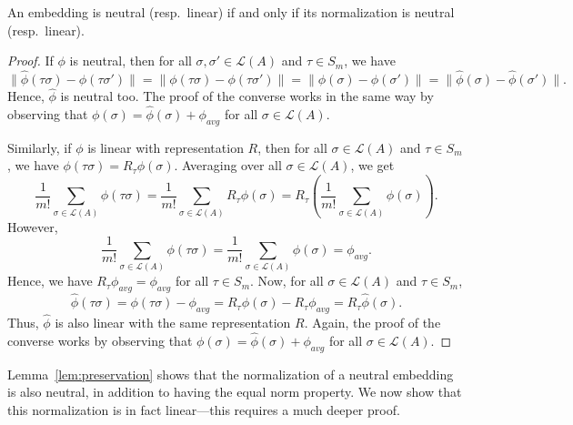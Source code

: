 \documentclass[prodmode]{acmsmall-ec14}
\newcommand{\calL}{{\mathcal{L}}}
\newcommand{\rank}{{\calL(A)}}
\begin{document}
\begin{lemma}
An embedding is neutral (resp.\ linear) if and only if its normalization is neutral (resp.\ linear). 
\label{lem:preservation}
\end{lemma}
\begin{proof}
If $\phi$ is neutral, then for all $\sigma,\sigma' \in \rank$ and $\tau \in S_m$, we have 
$$
\|\hat{\phi}(\tau \sigma)-\hat{\phi}(\tau \sigma')\| = \|\phi(\tau \sigma)-\phi(\tau \sigma')\| = \|\phi(\sigma)-\phi(\sigma')\| = \|\hat{\phi}(\sigma)-\hat{\phi}(\sigma')\|.
$$
Hence, $\hat{\phi}$ is neutral too. The proof of the converse works in the same way by observing that $\phi(\sigma) = \hat{\phi}(\sigma)+\phi_{avg}$ for all $\sigma \in \rank$. 

Similarly, if $\phi$ is linear with representation $R$, then for all $\sigma \in \rank$ and $\tau \in S_m$, we have $\phi(\tau \sigma) = R_{\tau}\phi(\sigma)$. Averaging over all $\sigma \in \rank$, we get 
$$
\frac{1}{m!} \sum_{\sigma \in \rank} \phi(\tau \sigma) = \frac{1}{m!}  \sum_{\sigma \in \rank} R_{\tau} \phi(\sigma) = R_{\tau} \left (\frac{1}{m!}  \sum_{\sigma \in \rank} \phi(\sigma) \right).
$$
However, 
$$
\frac{1}{m!}  \sum_{\sigma \in \rank} \phi(\tau \sigma) = \frac{1}{m!}  \sum_{\sigma \in \rank} \phi(\sigma) = \phi_{avg}.
$$
Hence, we have $R_{\tau}\phi_{avg} = \phi_{avg}$ for all $\tau \in S_m$. Now, for all $\sigma \in \rank$ and $\tau \in S_m$, 
$$
\hat{\phi}(\tau \sigma) = \phi(\tau \sigma) - \phi_{avg} = R_{\tau}\phi(\sigma) - R_{\tau}\phi_{avg} = R_{\tau}\hat{\phi}(\sigma).
$$
Thus, $\hat{\phi}$ is also linear with the same representation $R$. Again, the proof of the converse works by observing that $\phi(\sigma) = \hat{\phi}(\sigma)+\phi_{avg}$ for all $\sigma \in \rank$. 
\end{proof}
%
Lemma~\ref{lem:preservation} shows that the normalization of a neutral embedding is also neutral, in addition to having the equal norm property. We now show that this normalization is in fact linear---this requires a much deeper proof. 
\end{document}
